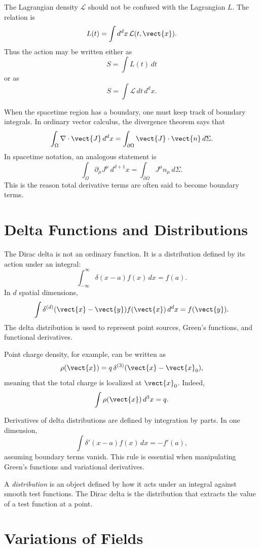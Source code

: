 The Lagrangian density \(\mathcal{L}\) should not be confused with the
Lagrangian \(L\). The relation is
\[
    L(t) = \int d^d x\,\mathcal{L}(t,\vect{x}).
\]
Thus the action may be written either as
\[
    S = \int L(t)\,dt
\]
or as
\[
    S = \int \mathcal{L}\,dt\,d^d x.
\]

When the spacetime region has a boundary, one must keep track of boundary
integrals. In ordinary vector calculus, the divergence theorem says that
\[
    \int_\Omega \nabla\cdot\vect{J}\,d^d x
    = \int_{\partial\Omega} \vect{J}\cdot\vect{n}\,d\Sigma.
\]
In spacetime notation, an analogous statement is
\[
    \int_\Omega \partial_\mu J^\mu\,d^{d+1}x
    = \int_{\partial\Omega} J^\mu n_\mu\,d\Sigma.
\]
This is the reason total derivative terms are often said to become boundary
terms.

\section{Delta Functions and Distributions}

The Dirac delta is not an ordinary function. It is a distribution defined by
its action under an integral:
\[
    \int_{-\infty}^{\infty}\delta(x-a)f(x)\,dx = f(a).
\]
In \(d\) spatial dimensions,
\[
    \int \delta^{(d)}(\vect{x}-\vect{y})f(\vect{x})\,d^d x
    = f(\vect{y}).
\]
The delta distribution is used to represent point sources, Green's functions,
and functional derivatives.

Point charge density, for example, can be written as
\[
    \rho(\vect{x}) = q\,\delta^{(3)}(\vect{x}-\vect{x}_0),
\]
meaning that the total charge is localized at \(\vect{x}_0\). Indeed,
\[
    \int \rho(\vect{x})\,d^3x = q.
\]

Derivatives of delta distributions are defined by integration by parts. In one
dimension,
\[
    \int \delta'(x-a)f(x)\,dx = -f'(a),
\]
assuming boundary terms vanish. This rule is essential when manipulating
Green's functions and variational derivatives.

\begin{definitionbox}
A \emph{distribution} is an object defined by how it acts under an integral
against smooth test functions. The Dirac delta is the distribution that extracts
the value of a test function at a point.
\end{definitionbox}

\section{Variations of Fields}

